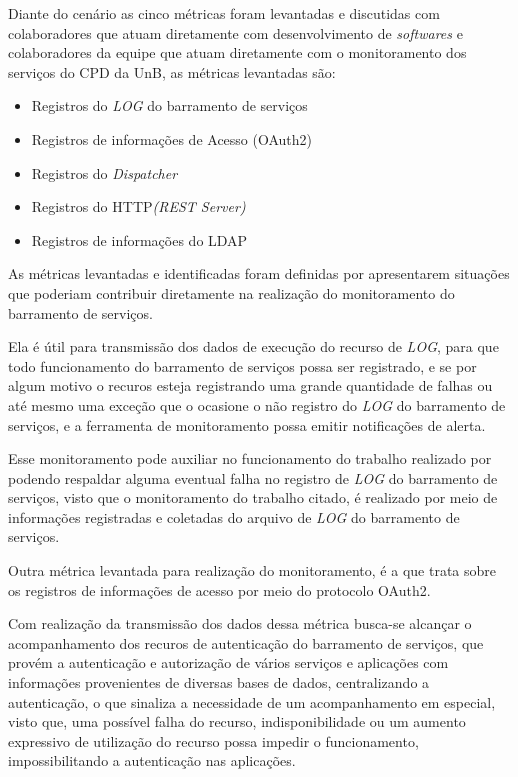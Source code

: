 Diante do cenário as cinco métricas foram levantadas e discutidas com colaboradores que atuam diretamente com desenvolvimento de  \textit{softwares} e colaboradores da equipe que atuam diretamente com o monitoramento dos serviços do \acrshort{CPD} da \acrshort{UnB}, as métricas levantadas são: 

\begin{itemize}
    \item Registros do \textit{LOG} do barramento de serviços
    \item Registros de informações de Acesso (OAuth2)
    \item Registros do \textit{Dispatcher}
    \item Registros do HTTP\textit{(REST Server)}
    \item Registros de informações do LDAP
\end{itemize}

As métricas levantadas e identificadas foram definidas por apresentarem situações que poderiam contribuir diretamente na realização do monitoramento do barramento de serviços. 

Ela é útil para transmissão dos dados de execução do recurso de \textit{LOG}, para que todo funcionamento do barramento de serviços possa ser registrado, e se por algum motivo o recuros esteja registrando uma grande quantidade de falhas ou até mesmo uma exceção que o ocasione o não registro do \textit{LOG} do barramento de serviços, e a ferramenta de monitoramento possa emitir notificações de alerta.

Esse monitoramento pode auxiliar no funcionamento do trabalho realizado por \cite{filgueirasmonitoramento} podendo respaldar alguma eventual falha no registro de \textit{LOG} do barramento de serviços, visto que o monitoramento do trabalho citado, é realizado por meio de informações registradas e coletadas do arquivo de \textit{LOG} do barramento de serviços. 

Outra métrica levantada para realização do monitoramento, é a que trata sobre os registros de informações de acesso por meio do protocolo OAuth2. 

Com realização da transmissão dos dados dessa métrica busca-se alcançar o acompanhamento dos recuros de autenticação do barramento de serviços, que provém a autenticação e autorização de vários serviços e aplicações com informações provenientes de diversas bases de dados, centralizando a autenticação, o que sinaliza a necessidade de um acompanhamento em especial, visto que, uma possível falha do recurso, indisponibilidade ou um aumento expressivo de utilização do recurso possa impedir o funcionamento, impossibilitando a autenticação nas aplicações. 

